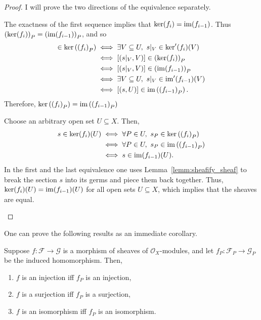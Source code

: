 \begin{proof}
  I will prove the two directions of the equivalence separately.
  \begin{description}[style=nextline]
    \item[$\Longrightarrow\big)$]
          The exactness of the first sequence implies
          that $\ker(f_{i})=\operatorname{im}(f_{i-1})$. Thus $\left(\ker(f_{i})\right)_{P}
          =\left(\operatorname{im}(f_{i-1})\right)_{P}$, and so
          \begin{align*}
            [(s, U)]\in\ker\left(\left(f_{i}\right)_{P}\right)
            &\iff \exists V\subseteq U,\ s\vert_{V}\in\ker^{\prime}(f_{i})(V)\\
            &\iff [(s\vert_{V},V)]\in\left(\ker(f_{i})\right)_{P} \\
            &\iff [(s\vert_{V},V)]\in\left(\im(f_{i-1})\right)_{P} \\
            &\iff \exists V\subseteq U,\ s\vert_{V}\in
              \im^{\prime}(f_{i-1})(V) \\
            &\iff [(s,U)]\in\im\left(\left(f_{i-1}\right)_{P}\right).
          \end{align*}
          Therefore, $\ker\left(\left(f_{i}\right)_{P}\right)
          =\operatorname{im}\left(\left(f_{i-1}\right)_{P}\right)$
    \item[$\Longleftarrow\big)$]
          Choose an arbitrary open set $U\subseteq X$. Then,
          \begin{align*}
            s\in\ker(f_{i})(U)
            &\iff \forall P\in U,\ s_{P}\in\ker\left(\left(
              f_{i}\right)_{P}\right) \\
            &\iff \forall P\in U,\ s_{P}\in\operatorname{im}\left(\left(
              f_{i-1}\right)_{P}\right) \\
            &\iff s\in\operatorname{im}(f_{i-1})(U).
          \end{align*}
          In the first and the last equivalence one uses
          Lemma~\ref{lemm:sheafify_sheaf} to break the section $s$ into
          its germs and piece them back together. Thus,
          $\ker(f_{i})(U)=\operatorname{im}(f_{i-1})(U)$ for all open sets
          $U\subseteq X$, which implies that the sheaves are equal.
  \end{description}
\end{proof}
One can prove the following results as an immediate corollary.
\begin{cor}
  Suppose $f:\mathscr{F}\to\mathscr{G}$ is a morphism of sheaves of
  $\mathscr{O}_{X}$-modules, and let $f_{P}:\mathscr{F}_{P}\to\mathscr{G}_{P}$
  be the induced homomorphism. Then,
  \begin{enumerate}
    \item $f$ is an injection iff $f_{P}$ is an injection,
    \item $f$ is a surjection iff $f_{P}$ is a surjection,
    \item $f$ is an isomorphism iff $f_{P}$ is an isomorphism.
  \end{enumerate}
\end{cor}

